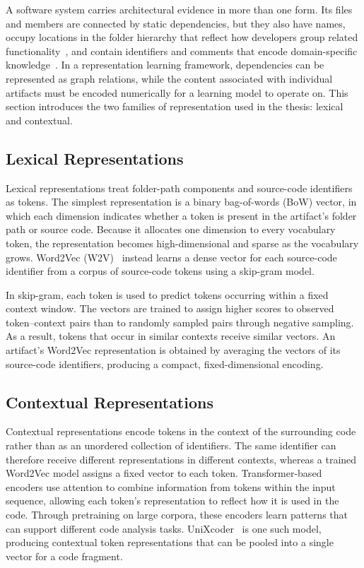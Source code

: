 A software system carries architectural evidence in more than one form. Its files and members are connected by static dependencies, but they also have names, occupy locations in the folder hierarchy that reflect how developers group related functionality~\cite{garcia2013}, and contain identifiers and comments that encode domain-specific knowledge~\cite{sarif}. In a representation learning framework, dependencies can be represented as graph relations, while the content associated with individual artifacts must be encoded numerically for a learning model to operate on. This section introduces the two families of representation used in the thesis: lexical and contextual.


\subsection{Lexical Representations \label{sec:bg_lexical}}

Lexical representations treat folder-path components and source-code identifiers as tokens. The simplest representation is a binary bag-of-words (BoW) vector, in which each dimension indicates whether a token is present in the artifact’s folder path or source code. Because it allocates one dimension to every vocabulary token, the representation becomes high-dimensional and sparse as the vocabulary grows. Word2Vec (W2V)~\cite{word2vec} instead learns a dense vector for each source-code identifier from a corpus of source-code tokens using a skip-gram model.

In skip-gram, each token is used to predict tokens occurring within a fixed context window. The vectors are trained to assign higher scores to observed token--context pairs than to randomly sampled pairs through negative sampling. As a result, tokens that occur in similar contexts receive similar vectors. An artifact’s Word2Vec representation is obtained by averaging the vectors of its source-code identifiers, producing a compact, fixed-dimensional encoding.

\subsection{Contextual Representations}

Contextual representations encode tokens in the context of the surrounding code rather than as an unordered collection of identifiers. The same identifier can therefore receive different representations in different contexts, whereas a trained Word2Vec model assigns a fixed vector to each token. Transformer-based encoders use attention to combine information from tokens within the input sequence, allowing each token’s representation to reflect how it is used in the code. Through pretraining on large corpora, these encoders learn patterns that can support different code analysis tasks. UniXcoder~\cite{unixcoder} is one such model, producing contextual token representations that can be pooled into a single vector for a code fragment.

